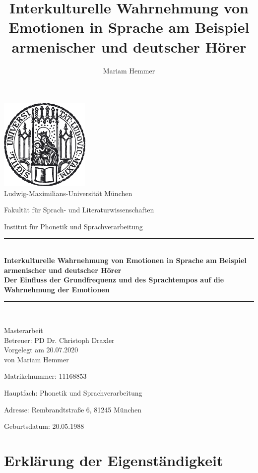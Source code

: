 \documentclass[11pt,a4paper,headsepline,twoside,toc=bibliography]{scrreprt}
\author{Mariam Hemmer}
\title{Interkulturelle Wahrnehmung von Emotionen in Sprache am Beispiel armenischer und deutscher Hörer}
\newcommand{\HRule}{\rule{\linewidth}{0.5mm}}
\begin{document}
\begin{titlepage}


\begin{center}
{
\scshape

\includegraphics{siegel}\\[1cm]    

{\LARGE Ludwig-Maximilians-Universität München}

Fakultät für Sprach- und Literaturwissenschaften

Institut für Phonetik und Sprachverarbeitung\\[0.75cm]

{
\HRule \\[0.4cm]

{
\huge \bfseries Interkulturelle Wahrnehmung von Emotionen in Sprache am Beispiel armenischer und deutscher Hörer\\[0.3cm] \large Der Einfluss der Grundfrequenz und des Sprachtempos auf die Wahrnehmung der Emotionen\\[0.4cm]
}

\HRule \\[0.75cm]
}

{
\Large
Masterarbeit\\
Betreuer: PD Dr. Christoph Draxler\\[0.5cm]
Vorgelegt am 20.07.2020\\von Mariam Hemmer\\[0.5cm]
}

Matrikelnummer: 11168853

Hauptfach: Phonetik und Sprachverarbeitung

Adresse: Rembrandtstraße 6, 81245 München

Geburtsdatum: 20.05.1988

}
\end{center}
\cleardoublepage
\end{titlepage}

\chapter*{Erklärung der Eigenständigkeit}
\end{document}
